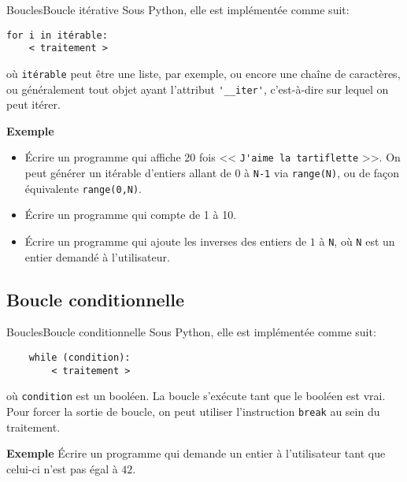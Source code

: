 \documentclass[10pt]{beamer}
\begin{document}
\begin{frame}[fragile]{Boucles}{Boucle itérative}
Sous Python, elle est implémentée comme suit:
\begin{lstlisting}
for i in itérable:
    < traitement >
\end{lstlisting}
où \lstinline|itérable| peut être une liste, par exemple, ou encore une chaîne de caractères, ou généralement tout objet ayant l'attribut \lstinline|'__iter'|, c'est-à-dire sur lequel on peut itérer.
\pause
	
	\begin{block}{\textbf{Exemple}}
		\begin{itemize}[<+->]
		\item Écrire un programme qui affiche 20 fois << \lstinline|J'aime la tartiflette| >>. On peut générer un itérable d'entiers allant de 0 à \lstinline|N-1| via \lstinline|range(N)|, ou de façon équivalente \lstinline|range(0,N)|.
		
		\item Écrire un programme qui compte de 1 à 10.
		
		\item Écrire un programme qui ajoute les inverses des entiers de $1$ à \lstinline|N|, où \lstinline|N| est un entier demandé à l'utilisateur.
		\end{itemize}
	\end{block}
\end{frame}

\subsection{Boucle conditionnelle}

\begin{frame}[fragile]{Boucles}{Boucle conditionnelle}
	Sous Python, elle est implémentée comme suit:
	\begin{lstlisting}
	while (condition):
	    < traitement >
	\end{lstlisting}
	où \lstinline|condition| est un booléen. La boucle s'exécute tant que le booléen est vrai.
	Pour forcer la sortie de boucle, on peut utiliser l'instruction \lstinline|break| au sein du traitement.
		
	\begin{block}{\textbf{Exemple}}
		Écrire un programme qui demande un entier à l'utilisateur tant que celui-ci n'est pas égal à $42$.
	\end{block}
\end{frame}
\end{document}
